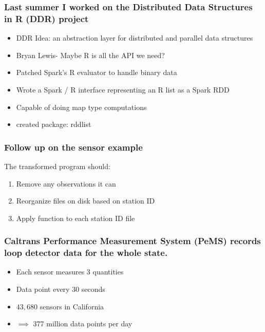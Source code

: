\documentclass{beamer}
\begin{document}
\begin{frame}

    \frametitle{Last summer I worked on the Distributed Data Structures in
R (DDR) project}


\begin{itemize}
    \item DDR Idea: an abstraction layer for distributed and parallel data structures
    \item Bryan Lewis- Maybe R is all the API we need?
    \item Patched Spark's R evaluator to handle binary data
    \item Wrote a Spark / R interface representing an R list as a Spark
        RDD
    \item Capable of doing map type computations
    \item created package: rddlist
\end{itemize}


\end{frame}
\begin{frame}

    \frametitle{Follow up on the sensor example}

    The transformed program should:

\begin{enumerate}
    \item Remove any observations it can
    \item Reorganize files on disk based on station ID
    \item Apply function to each station ID file
\end{enumerate}

\end{frame}
\begin{frame}


\frametitle{Caltrans Performance Measurement System (PeMS) records loop
    detector data for the whole state.}

    \begin{itemize}
        \item Each sensor measures 3 quantities
        \item Data point every 30 seconds
        \item $43,680$ sensors in California
        \item $\implies$  377 million data points per day
    \end{itemize}

\end{frame}
\end{document}
